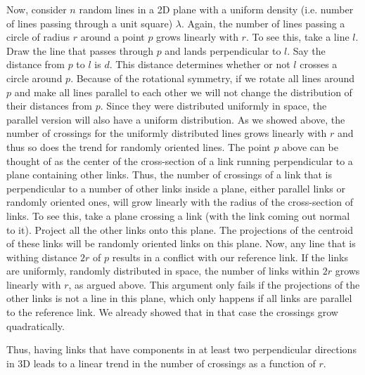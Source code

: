 \documentclass[endfloats,nofootinbib,preprint,floatfix,titlepage,superscriptaddress]{revtex4} %
\begin{document}
Now, consider $n$ random lines in a 2D plane with a uniform density (i.e. number of lines passing through a unit square) $\lambda$. Again, the number of lines passing a circle of radius $r$ around a point $p$ grows linearly with $r$. To see this, take a line $l$. Draw the line that passes through $p$ and lands perpendicular to $l$. Say the distance from $p$ to $l$ is $d$. 
This distance determines whether or not $l$ crosses a circle around $p$. Because of the rotational symmetry, if we rotate all lines around $p$ and make all lines parallel to each other we will not change the distribution of their distances from $p$. Since they were distributed uniformly in space, the parallel version will also have a uniform distribution. As we showed above, the number of crossings for the uniformly distributed lines grows linearly with $r$ and thus so does the trend for randomly oriented lines. 
The point $p$ above can be thought of as the center of the cross-section of a link running perpendicular to a plane containing other links. 
Thus, the number of crossings of a link that is perpendicular to a number of other links inside a plane, either parallel links or randomly oriented ones, will grow linearly with the radius of the cross-section of links. 
To see this, take a plane crossing a link (with the link coming out normal to it). 
Project all the other links onto this plane. 
The projections of the centroid of these links will be randomly oriented links on this plane. 
Now, any line that is withing distance $2r$ of $p$ results in a conflict with our reference link. 
If the links are uniformly, randomly distributed in space, the number of links within $2r$ grows linearly with $r$, as argued above. 
This argument only fails if the projections of the other links is not a line in this plane, which only happens if all links are parallel to the reference link. 
We already showed that in that case the crossings grow quadratically. 


Thus, having links that have components in at least two perpendicular directions in 3D leads to a linear trend in the number of crossings as a function of $r$.  
\end{document}
